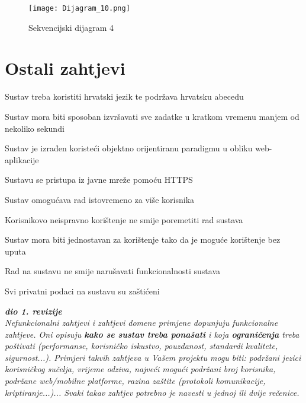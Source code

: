 				\begin{figure}[H]
					\centering
					\texttt{[image: Dijagram\_10.png]}
					\caption{Sekvencijski dijagram 4}
				\end{figure}		
				
		
		
				\newpage
	
		\section{Ostali zahtjevi}
		\begin{packed_item}
						\item \textit{} Sustav treba koristiti hrvatski jezik te podržava hrvatsku abecedu
						\item \textit{} Sustav mora biti sposoban izvršavati sve zadatke u kratkom vremenu manjem od nekoliko sekundi
						\item \textit{} Sustav je izrađen koristeći objektno orijentiranu paradigmu u obliku web-aplikacije
						\item \textit{} Sustavu se pristupa iz javne mreže pomoću HTTPS
						\item \textit{} Sustav omogućava rad istovremeno za više korisnika
				
						\item \textit{} Korisnikovo neispravno korištenje ne smije poremetiti rad sustava
						\item \textit{} Sustav mora biti jednostavan za korištenje tako da je moguće korištenje bez uputa
						\item \textit{} Rad na sustavu ne smije narušavati funkcionalnosti sustava
						\item \textit{} Svi privatni podaci na sustavu su zaštićeni 
				
		\end{packed_item}
		
		
		
			\textbf{\textit{dio 1. revizije}}\\
		 
			 \textit{Nefunkcionalni zahtjevi i zahtjevi domene primjene dopunjuju funkcionalne zahtjeve. Oni opisuju \textbf{kako se sustav treba ponašati} i koja \textbf{ograničenja} treba poštivati (performanse, korisničko iskustvo, pouzdanost, standardi kvalitete, sigurnost...). Primjeri takvih zahtjeva u Vašem projektu mogu biti: podržani jezici korisničkog sučelja, vrijeme odziva, najveći mogući podržani broj korisnika, podržane web/mobilne platforme, razina zaštite (protokoli komunikacije, kriptiranje...)... Svaki takav zahtjev potrebno je navesti u jednoj ili dvije rečenice.}
			 
			 
			 
	